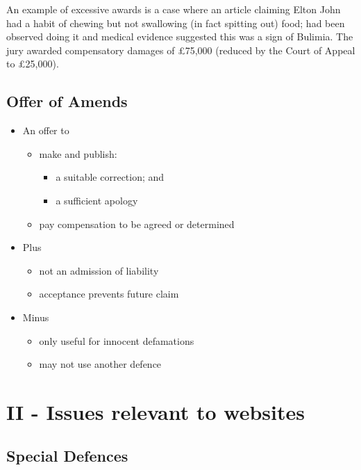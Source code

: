 \documentclass[]{article}
\begin{document}
An example of excessive awards is a case where an article claiming Elton
John had a habit of chewing but not swallowing (in fact spitting out)
food; had been observed doing it and medical evidence suggested this was
a sign of Bulimia. The jury awarded compensatory damages of £75,000
(reduced by the Court of Appeal to £25,000).

\subsection{Offer of Amends}

\begin{itemize}
\item
  An offer to

  \begin{itemize}
  \item
    make and publish:

    \begin{itemize}
    \item
      a suitable correction; and
    \item
      a sufficient apology
    \end{itemize}
  \item
    pay compensation to be agreed or determined
  \end{itemize}
\item
  Plus

  \begin{itemize}
  \item
    not an admission of liability
  \item
    acceptance prevents future claim
  \end{itemize}
\item
  Minus

  \begin{itemize}
  \item
    only useful for innocent defamations
  \item
    may not use another defence
  \end{itemize}
\end{itemize}

\section{II - Issues relevant to websites}

\subsection{Special Defences}
\end{document}
